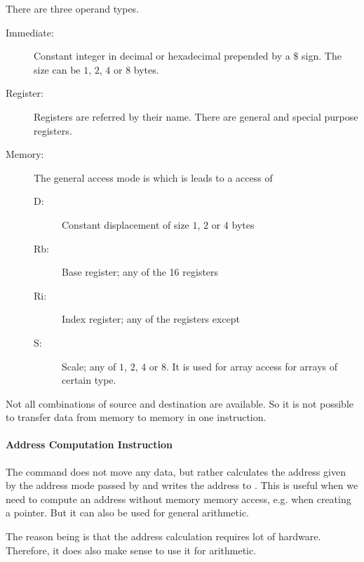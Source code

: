 There are three operand types.
\begin{description}
    \item[Immediate:] Constant integer in decimal or hexadecimal prepended by a $\$$ sign. The size can be $1$, $2$, $4$ or $8$ bytes.
    \item[Register:] Registers are referred by their name. There are general and special purpose registers.
    \item[Memory:] The general access mode is  which is leads to a access of 
        \begin{description}
            \item[D:] Constant displacement of size $1$, $2$ or $4$ bytes
            \item[Rb:] Base register; any of the 16 registers
            \item[Ri:] Index register; any of the registers except 
            \item[S:] Scale; any of $1$, $2$, $4$ or $8$. It is used for array access for arrays of certain type.
        \end{description}
\end{description}

Not all combinations of source and destination are available. So it is not possible to transfer data from memory to memory in one instruction.

\paragraph{Address Computation Instruction}
The command  does not move any data, but rather calculates the address given by the address mode passed by  and writes the address to . This is useful when we need to compute an address without memory memory access, e.g. when creating a pointer. But it can also be used for general arithmetic.

The reason being is that the address calculation requires lot of hardware. Therefore, it does also make sense to use it for arithmetic.
